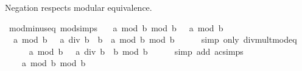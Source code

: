 \begin{isabellebody}
\endisatagproof
{\isafoldproof}%
%
\isadelimproof
%
\endisadelimproof
%
\begin{isamarkuptext}%
Negation respects modular equivalence.%
\end{isamarkuptext}\isamarkuptrue%
\isamarkupfalse%
\ mod{\isacharunderscore}{\kern0pt}minus{\isacharunderscore}{\kern0pt}eq\ {\isacharbrackleft}{\kern0pt}mod{\isacharunderscore}{\kern0pt}simps{\isacharbrackright}{\kern0pt}{\isacharcolon}{\kern0pt}\isanewline
\ \ {\isachardoublequoteopen}{\isacharparenleft}{\kern0pt}{\isacharminus}{\kern0pt}\ {\isacharparenleft}{\kern0pt}a\ mod\ b{\isacharparenright}{\kern0pt}{\isacharparenright}{\kern0pt}\ mod\ b\ {\isacharequal}{\kern0pt}\ {\isacharparenleft}{\kern0pt}{\isacharminus}{\kern0pt}\ a{\isacharparenright}{\kern0pt}\ mod\ b{\isachardoublequoteclose}\isanewline
%
\isadelimproof
%
\endisadelimproof
%
\isatagproof
{}\isamarkupfalse%
\ {\isacharminus}{\kern0pt}\isanewline
\ \ \isamarkupfalse%
\ {\isachardoublequoteopen}{\isacharparenleft}{\kern0pt}{\isacharminus}{\kern0pt}\ a{\isacharparenright}{\kern0pt}\ mod\ b\ {\isacharequal}{\kern0pt}\ {\isacharparenleft}{\kern0pt}{\isacharminus}{\kern0pt}\ {\isacharparenleft}{\kern0pt}a\ div\ b\ {\isacharasterisk}{\kern0pt}\ b\ {\isacharplus}{\kern0pt}\ a\ mod\ b{\isacharparenright}{\kern0pt}{\isacharparenright}{\kern0pt}\ mod\ b{\isachardoublequoteclose}\isanewline
\ \ \ \ \isamarkupfalse%
\ {\isacharparenleft}{\kern0pt}simp\ only{\isacharcolon}{\kern0pt}\ div{\isacharunderscore}{\kern0pt}mult{\isacharunderscore}{\kern0pt}mod{\isacharunderscore}{\kern0pt}eq{\isacharparenright}{\kern0pt}\isanewline
\ \ \isamarkupfalse%
\ \isamarkupfalse%
\ {\isachardoublequoteopen}{\isasymdots}\ {\isacharequal}{\kern0pt}\ {\isacharparenleft}{\kern0pt}{\isacharminus}{\kern0pt}\ {\isacharparenleft}{\kern0pt}a\ mod\ b{\isacharparenright}{\kern0pt}\ {\isacharplus}{\kern0pt}\ {\isacharminus}{\kern0pt}\ {\isacharparenleft}{\kern0pt}a\ div\ b{\isacharparenright}{\kern0pt}\ {\isacharasterisk}{\kern0pt}\ b{\isacharparenright}{\kern0pt}\ mod\ b{\isachardoublequoteclose}\isanewline
\ \ \ \ \isamarkupfalse%
\ {\isacharparenleft}{\kern0pt}simp\ add{\isacharcolon}{\kern0pt}\ ac{\isacharunderscore}{\kern0pt}simps{\isacharparenright}{\kern0pt}\isanewline
\ \ \isamarkupfalse%
\ \isamarkupfalse%
\ {\isachardoublequoteopen}{\isasymdots}\ {\isacharequal}{\kern0pt}\ {\isacharparenleft}{\kern0pt}{\isacharminus}{\kern0pt}\ {\isacharparenleft}{\kern0pt}a\ mod\ b{\isacharparenright}{\kern0pt}{\isacharparenright}{\kern0pt}\ mod\ b{\isachardoublequoteclose}\isanewline

\end{isabellebody}

